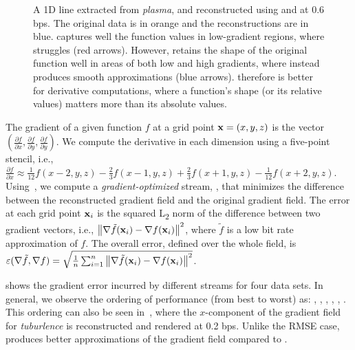 \begin{figure}[h]
\centering
{}
\caption{A 1D line extracted from \emph{plasma}, and reconstructed using \sbit and \swav at 0.6 bps.
The original data is in orange and the reconstructions are in blue. \swav captures well the function
values in low-gradient regions, where \sbit struggles (red arrows). However, \sbit retains the shape
of the original function well in areas of both low and high gradients, where \swav instead produces
smooth approximations (blue arrows). \sbit therefore is better for derivative computations, where a
function's shape (or its relative values) matters more than its absolute values.}
\label{fig:bit-plane-vs-wavelet-norm-gradient}
\end{figure}

The gradient of a given function $f$ at a grid point $\x = (x,y,z)$ is the vector
$(\frac{\partial f}{\partial x},\frac{\partial f}{\partial y}, \frac{\partial f}{\partial y})$. We
compute the derivative in each dimension using a five-point stencil, i.e., $\frac{\partial
f}{\partial x} \approx \frac{1}{12}f(x-2,y,z) - \frac{2}{3}f(x-1,y,z) + \frac{2}{3}f(x+1,y,z) -
\frac{1}{12}f(x+2,y,z)$. 
Using~, we compute a \emph{gradient-optimized} stream, \sgop, that minimizes the
difference between the reconstructed gradient field and the original gradient field. The error at
each grid point $\x_i$ is the squared L\textsubscript{2} norm of the difference between two gradient
vectors, i.e., $\norm{\nabla \tilde{f}(\x_i) - \nabla f(\x_i)}^2$, where $\tilde{f}$ is a low bit rate
approximation of $f$. The overall error, defined over the whole field, is
$\err(\nabla \tilde{f}, \nabla f) = \sqrt{\frac{1}{n} \sum_{i=1}^{n}{\norm{\nabla
\tilde{f}(\x_i)-\nabla f(\x_i)}^2}}$.

 shows the gradient error incurred by different streams for four
data sets. In general, we observe the ordering of performance (from best to worst) as: \sgop, \sgsg,
\sbit, \swav, \smag, \slvl. This ordering can also be seen in~,
where the $x$-component of the gradient field for \emph{tuburlence} is reconstructed and rendered
at 0.2 bps. Unlike the RMSE case, \sbit produces better approximations of the gradient field
compared to \swav.

